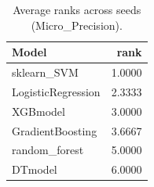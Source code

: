 \begin{table}[t]
\centering
\begin{tabular}{lr}
\toprule
Model & rank \\
\midrule
sklearn_SVM & 1.0000 \\
LogisticRegression & 2.3333 \\
XGBmodel & 3.0000 \\
GradientBoosting & 3.6667 \\
random_forest & 5.0000 \\
DTmodel & 6.0000 \\
\bottomrule
\end{tabular}
\caption{Average ranks across seeds (Micro_Precision).}
\label{tab:avg_rank_Micro_Precision}
\end{table}